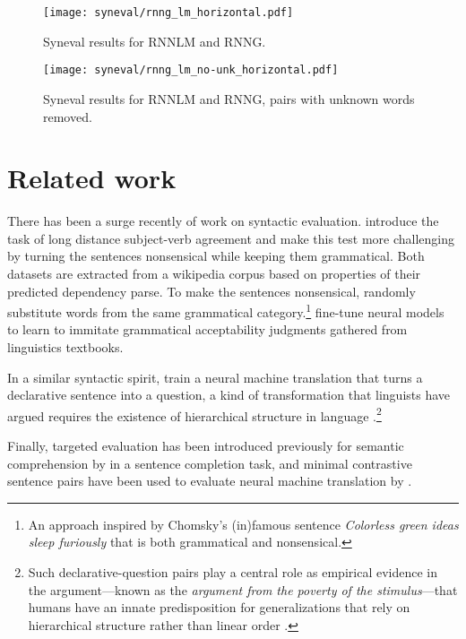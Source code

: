     \begin{figure}[h]
      \center
      \texttt{[image: syneval/rnng\_lm\_horizontal.pdf]}
    \caption{Syneval results for RNNLM and RNNG.}
    \label{fig:syneval-lm-rnng}
    \end{figure}

    \begin{figure}[h]
      \center
      \texttt{[image: syneval/rnng\_lm\_no-unk\_horizontal.pdf]}
    \caption{Syneval results for RNNLM and RNNG, pairs with unknown words removed.}
    \label{fig:syneval-lm-rnng-nounk}
    \end{figure}

\section{Related work}
  There has been a surge recently of work on syntactic evaluation. \citet{linzen2016syntax} introduce the task of long distance subject-verb agreement and \citet{gulordava2018colorless} make this test more challenging by turning the sentences nonsensical while keeping them grammatical. Both datasets are extracted from a wikipedia corpus based on properties of their predicted dependency parse. To make the sentences nonsensical, \citet{gulordava2018colorless} randomly substitute words from the same grammatical category.\footnote{An approach inspired by Chomsky's (in)famous sentence \textit{Colorless green ideas sleep furiously} that is both grammatical and nonsensical.} \citet{warstadt2018acceptability} fine-tune neural models to learn to immitate grammatical acceptability judgments gathered from linguistics textbooks.

  In a similar syntactic spirit, \citet{mccoy2018revisiting} train a neural machine translation that turns a declarative sentence into a question, a kind of transformation that linguists have argued requires the existence of hierarchical structure in language \citep{everaert2015structures}.\footnote{Such declarative-question pairs play a central role as empirical evidence in the argument---known as the \textit{argument from the poverty of the stimulus}---that humans have an innate predisposition for generalizations that rely on hierarchical structure rather than linear order \citep{chomsky1980rules}.}

  Finally, targeted evaluation has been introduced previously for semantic comprehension by \citet{zweig2011microsoft} in a sentence completion task, and minimal contrastive sentence pairs have been used to evaluate neural machine translation by \citet{sennrich2017grammatical}.
